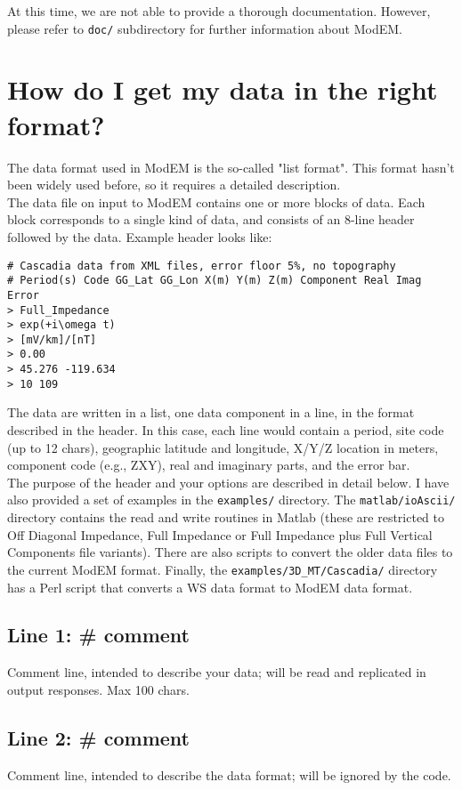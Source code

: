 \documentclass[12pt]{article}
\begin{document}
At this time, we are not able to provide a thorough documentation. However,
please refer to \verb"doc/" subdirectory for further information about ModEM.


\section{How do I get my data in the right format?}

The data format used in ModEM is the so-called "list format". This format hasn't been widely used before, so it requires a detailed description.\\

The data file on input to ModEM contains one or more blocks of data. Each block corresponds to a single kind of data, and consists of an 8-line header followed by the data. Example header looks like:
\begin{verbatim}
# Cascadia data from XML files, error floor 5%, no topography
# Period(s) Code GG_Lat GG_Lon X(m) Y(m) Z(m) Component Real Imag Error
> Full_Impedance
> exp(+i\omega t)
> [mV/km]/[nT]
> 0.00
> 45.276 -119.634
> 10 109
\end{verbatim}

The data are written in a list, one data component in a line, in the format described in the header. In this case, each line would contain a period, site code (up to 12 chars), geographic latitude and longitude, X/Y/Z location in meters, component code (e.g., ZXY), real and imaginary parts, and the error bar.\\

The purpose of the header and your options are described in detail below. I have also provided a set of examples in the \verb"examples/" directory. The \verb"matlab/ioAscii/" directory contains the read and write routines in Matlab (these are restricted to Off Diagonal Impedance, Full Impedance or Full Impedance plus Full Vertical Components file variants). There are also scripts to convert the older data files to the current ModEM format. Finally, the \verb"examples/3D_MT/Cascadia/" directory has a Perl script that converts a WS data format to ModEM data format.

\subsection*{Line 1: \# comment}
Comment line, intended to describe your data; will be read and replicated in output responses. Max 100 chars.

\subsection*{Line 2: \# comment}
Comment line, intended to describe the data format; will be ignored by the code. \\
\end{document}
